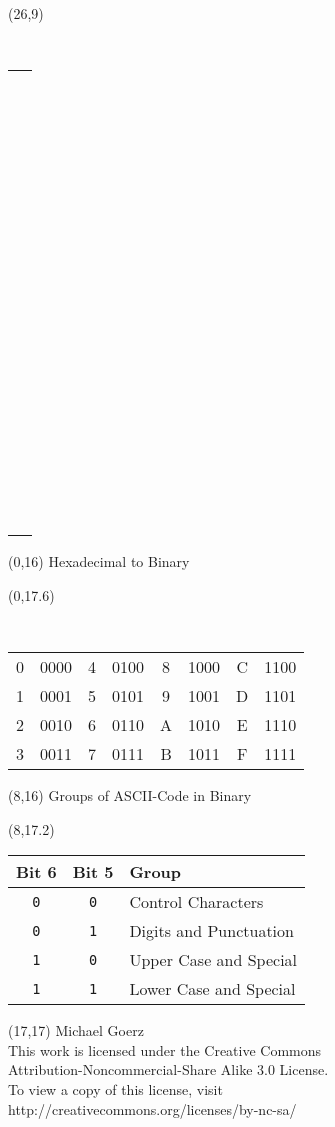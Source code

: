 \documentclass[a4paper, landscape, 10pt]{article} %
\begin{document}
\begin{textblock}{3}(26,9)
{\tt 
  \begin{tabular*}{\textwidth}{|c}
    ~ \\ ~ \\ ~ \\ ~ \\ ~ \\ ~ \\ ~ \\ ~ \\ 
    ~ \\ ~ \\ ~ \\ ~ \\ ~ \\ ~ \\ ~ \\ ~ 
  \end{tabular*}
}
\end{textblock}




\begin{textblock}{6}(0,16)
  \center
   Hexadecimal to Binary
\end{textblock}
\begin{textblock}{6}(0,17.6)
{\tt
    \begin{tabular}{|cc|cc||cc|cc|}
      \hline
      0 & 0000 & 4 & 0100 & 8 & 1000 & C & 1100 \\ 
      1 & 0001 & 5 & 0101 & 9 & 1001 & D & 1101 \\ 
      2 & 0010 & 6 & 0110 & A & 1010 & E & 1110 \\ 
      3 & 0011 & 7 & 0111 & B & 1011 & F & 1111 \\
      \hline
    \end{tabular}
}
\end{textblock}


\begin{textblock}{6}(8,16)
  \center
   Groups of ASCII-Code in Binary
\end{textblock}
\begin{textblock}{6}(8,17.2)
{
  \begin{tabular}{|c|c|l|}
    \hline
    Bit 6       & Bit 5       & Group \\
    \hline
    {\tt 0}     & {\tt 0}     & Control Characters     \\ 
    {\tt 0}     & {\tt 1}     & Digits and Punctuation \\ 
    {\tt 1}     & {\tt 0}     & Upper Case and Special \\ 
    {\tt 1}     & {\tt 1}     & Lower Case and Special \\
    \hline
  \end{tabular}
}
\end{textblock}

\begin{textblock}{8}(17,17)
   Michael Goerz \\
  { \small
  This work is licensed under the Creative Commons \\
  Attribution-Noncommercial-Share Alike 3.0 License.\\
  To view a copy of this license, visit\\
  http://creativecommons.org/licenses/by-nc-sa/ 
  }
\end{textblock}
\end{document}
